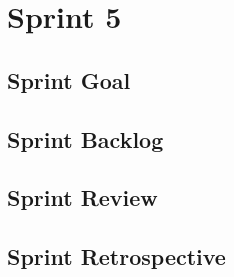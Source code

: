 \documentclass{report}
\begin{document}
    \chapter{Sprint 5}
    \section{Sprint Goal}
        
    \section{Sprint Backlog}
        
    \section{Sprint Review}
        
    \section{Sprint Retrospective}
        
    
    
    
    

\nocite{*} %
\end{document}
